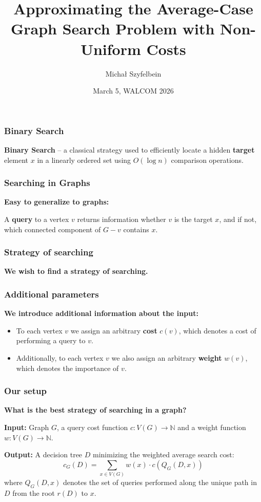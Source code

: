 \documentclass{beamer}
\title{Approximating the Average-Case Graph Search Problem with Non-Uniform Costs}
\author{Michał Szyfelbein}
\institute{Gdańsk University of Technology, Poland}
\date{March 5, WALCOM 2026}
\newcommand{\br}[1]{\mathopen{}\left( #1 \right)}
\begin{document}

\usetikzlibrary {graphs,graphdrawing} 

\frame{\titlepage}

\begin{frame}
\frametitle{Binary Search}
\textbf{Binary Search} – a classical strategy used to efficiently locate a hidden \textbf{target} element $x$ in a linearly ordered set using $O\br{\log n}$ comparison operations.


\end{frame}

\begin{frame}
\frametitle{Searching in Graphs}
\textbf{Easy to generalize to graphs:} 

A \textbf{query} to a vertex $v$ returns information whether $v$ is the target $x$, and if not, which connected component of $G-v$ contains $x$.
\pause


\end{frame}
\begin{frame}\frametitle{Strategy of searching}

\textbf{We wish to find a strategy of searching.}

\end{frame}

\begin{frame}\frametitle{Additional parameters}
    \textbf{We introduce additional information about the input:}
    \begin{itemize}
        \item 
    To each vertex $v$ we assign an arbitrary \textbf{cost} $c\br{v}$, which denotes a cost of performing a query to $v$.
    \item 
    Additionally, to each vertex $v$ we also assign an arbitrary \textbf{weight} $w\br{v}$, which denotes the importance of $v$.
    \end{itemize}

\end{frame}

\begin{frame}
\frametitle{Our setup}
\textbf{What is the best strategy of searching in a graph?}
\begin{tcolorbox}[colback=white, title=Graph Search Problem (GSP), fonttitle=\bfseries, breakable]
\textbf{Input:} Graph $G$, a query cost function $c\colon V\br{G}\to \mathbb{N}$ and a weight function $w\colon V\br{G}\to \mathbb{N}$.

\textbf{Output:} A decision tree $D$ minimizing the weighted average search cost: 
$$c_G\br{D} = \sum_{x\in V\br{G}}w\br{x}\cdot c\br{Q_G\br{D, x}}$$
where $Q_G\br{D,x}$ denotes the set of queries performed 
along the unique path in $D$ from the root $r\br{D}$ to $x$.
\end{tcolorbox}
\end{frame}
\end{document}
